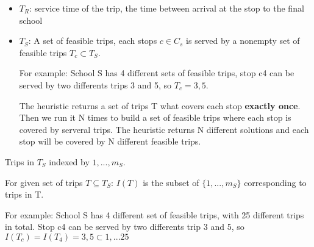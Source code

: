 \begin{enumerate}
\begin{itemize}
\item \(T_R\): service time of the trip, the time between arrival at the stop to the final school

\item \(T_S\): A set of feasible trips, each stops \(c \in C_s\) is served by a nonempty 
set of feasible trips \(T_c \subset T_S\).

For example:
School S has 4 different sets of feasible trips, stop c4 can be served by two
differents trips 3 and 5, so \(T_c = {3,5}\).

The heuristic returns a set of trips T what covers each stop \textbf{\textbf{exactly once}}.
Then we run it N times to build a set of feasible trips where each stop is
covered by serveral trips. The heuristic returns N different solutions and
each stop will be covered by N different feasible trips.
\end{itemize}

Trips in \(T_S\) indexed by \(1,...,m_S\).

For given set of trips \(T \subseteq T_S\): \(I(T)\) is the subset of
\(\{1,...,m_S\}\) corresponding to trips in T.

For example:
School S has 4 different set of feasible trips, with 25 different trips in total.
Stop c4 can be served by two differents trip 3 and 5, so \(I(T_c) = I(T_4) = {3,5}
\subset {1,...25}\)
\end{enumerate}

